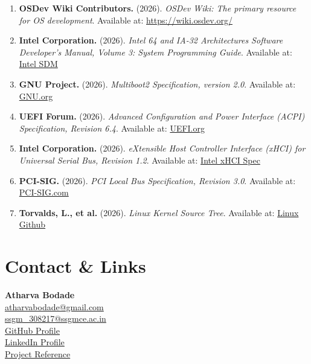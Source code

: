 \documentclass[12pt,a4paper]{report}
\begin{document}
\begin{enumerate}
    \item \textbf{OSDev Wiki Contributors.} (2026). \textit{OSDev Wiki: The primary resource for OS development}. Available at: \href{https://wiki.osdev.org/}{https://wiki.osdev.org/}
    \item \textbf{Intel Corporation.} (2026). \textit{Intel 64 and IA-32 Architectures Software Developer’s Manual, Volume 3: System Programming Guide}. Available at: \href{https://software.intel.com/content/www/us/en/develop/articles/intel-sdm.html}{Intel SDM}
    \item \textbf{GNU Project.} (2026). \textit{Multiboot2 Specification, version 2.0}. Available at: \href{https://www.gnu.org/software/grub/manual/multiboot2/}{GNU.org}
    \item \textbf{UEFI Forum.} (2026). \textit{Advanced Configuration and Power Interface (ACPI) Specification, Revision 6.4}. Available at: \href{https://uefi.org/specifications}{UEFI.org}
    \item \textbf{Intel Corporation.} (2026). \textit{eXtensible Host Controller Interface (xHCI) for Universal Serial Bus, Revision 1.2}. Available at: \href{https://www.intel.com/content/www/us/en/io/universal-serial-bus/extensible-host-controler-interface-usb-xhci.html}{Intel xHCI Spec}
    \item \textbf{PCI-SIG.} (2026). \textit{PCI Local Bus Specification, Revision 3.0}. Available at: \href{https://pcisig.com/specifications}{PCI-SIG.com}
    \item \textbf{Torvalds, L., et al.} (2026). \textit{Linux Kernel Source Tree}. Available at: \href{https://github.com/torvalds/linux}{Linux Github}
\end{enumerate}

\newpage

\chapter*{Contact \& Links}
\centering
\vspace{2cm}
\textbf{Atharva Bodade}\\
\vspace{1cm}
\href{mailto:atharvabodade@gmail.com}{atharvabodade@gmail.com}\\
\vspace{0.3cm}
\href{mailto:ssgm_308217@ssgmce.ac.in}{ssgm\_308217@ssgmce.ac.in}\\
\vspace{0.5cm}
\href{https://github.com/UnsettledAverage73}{GitHub Profile}\\
\vspace{0.3cm}
\href{https://www.linkedin.com/in/unsettledaverage73/}{LinkedIn Profile}\\
\vspace{0.3cm}
\href{https://kernel.org/}{Project Reference}\\
\end{document}
